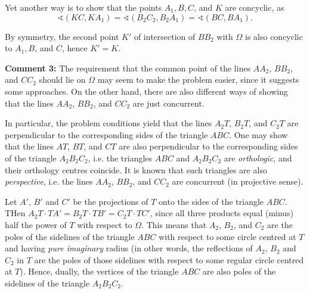 \documentclass[a4paper, 12pt]{article}
\begin{document}
\begin{enumerate}
Yet another way is to show that the points $A_1, B, C$, and $K$ are concyclic, as
$$
\sphericalangle (KC, KA_1) = \sphericalangle(B_2 C_2, B_2 A_1) = \sphericalangle(BC, BA_1).
$$

By symmetry, the second point $K'$ of intersection of $BB_2$ with $\Omega$ is also concyclic to $A_1, B$, and $C$, hence $K' = K$.






\textbf{Comment 3:}  The requirement that the common point of the lines $AA_2$, $BB_2$, and $CC_2$ should lie on $\Omega$ may seem to make the problem easier, since it suggests some approaches.  On the other hand, there are also different ways of showing that the lines $AA_2$, $BB_2$, and $CC_2$ are just concurrent.

In particular, the problem conditions yield that the lines $A_2 T$, $B_2 T$, and $C_2 T$ are perpendicular to the corresponding sides of the triangle $ABC$. One may show that the lines $AT$, $BT$, and $CT$ are also perpendicular to the corresponding sides of the triangle $A_2 B_2 C_2$, i.e. the triangles $ABC$ and $A_2 B_2 C_2$ are \textit{orthologic}, and their orthology centres coincide. It is known that such triangles are also \textit{perspective}, i.e. the lines $AA_2$, $BB_2$, and $CC_2$ are concurrent (in projective sense).

Let $A'$, $B'$ and $C'$ be the projections of $T$ onto the sides of the triangle $ABC$. THen $A_2 T \cdot T A' = B_2 T \cdot TB' = C_2 T \cdot TC'$, since all three products equal (minus) half the power of $T$ with respect to $\Omega$. This means that $A_2$, $B_2$, and $C_2$ are the poles of the sidelines of the triangle $ABC$ with respect to some circle centred at $T$ and having \textit{pure imaginary} radius (in other words, the reflections of $A_2$, $B_2$ and $C_2$ in $T$ are the poles of those sidelines with respect to some regular circle centred at $T$). Hence, dually, the vertices of the triangle $ABC$ are also poles of the sidelines of the triangle $A_2 B_2 C_2$.

\vspace{6mm}


    

\end{enumerate}
\end{document}
